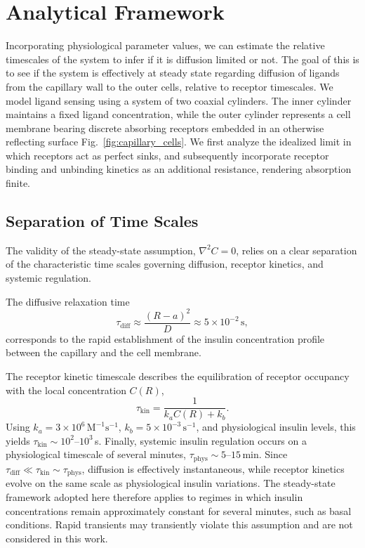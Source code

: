 \section{Analytical Framework}\label{sec:analytical}
Incorporating physiological parameter values,
we can estimate the relative timescales of the system to infer if it is diffusion limited or not.
The goal of this is to see if the system is effectively at steady state regarding diffusion of ligands from the capillary wall to the outer cells,
relative to receptor timescales.
We model ligand sensing using a system of two coaxial cylinders.
The inner cylinder maintains a fixed ligand concentration, while the outer cylinder represents a cell membrane bearing discrete absorbing receptors embedded in an otherwise reflecting surface Fig.~\ref{fig:capillary_cells}.
We first analyze the idealized limit in which receptors act as perfect sinks, and subsequently incorporate receptor binding and unbinding kinetics as an additional resistance, rendering absorption finite.

\subsection{Separation of Time Scales}\label{sec:timescales}
The validity of the steady-state assumption, $\nabla^{2} C = 0$,
relies on a clear separation of the characteristic time scales governing diffusion, receptor kinetics, and systemic regulation.

The diffusive relaxation time
\begin{equation}
    \tau_{\mathrm{diff}} \approx \frac{(R-a)^{2}}{D} \approx 5 \times 10^{-2}\,\mathrm{s},
    \label{eq:tau_diff}
\end{equation}
corresponds to the rapid establishment of the insulin concentration profile between the capillary and the cell membrane.

The receptor kinetic timescale describes the equilibration of receptor occupancy with the local concentration $C(R)$,
\begin{equation}
    \tau_{\mathrm{kin}} = \frac{1}{k_a C(R) + k_b}.
    \label{eq:tau_kin}
\end{equation}
Using $k_a = 3 \times 10^{6}\,\mathrm{M}^{-1}\mathrm{s}^{-1}$, $k_b = 5 \times 10^{-3}\,\mathrm{s}^{-1}$, and physiological insulin levels, this yields $\tau_{\mathrm{kin}} \sim 10^{2}$--$10^{3}$\,s.
Finally, systemic insulin regulation occurs on a physiological timescale of several minutes, $\tau_{\mathrm{phys}} \sim 5$--$15$\,min.
Since $\tau_{\mathrm{diff}} \ll \tau_{\mathrm{kin}} \sim \tau_{\mathrm{phys}}$, diffusion is effectively instantaneous, while receptor kinetics evolve on the same scale as physiological insulin variations. The steady-state framework adopted here therefore applies to regimes in which insulin concentrations remain approximately constant for several minutes, such as basal conditions. Rapid transients may transiently violate this assumption and are not considered in this work.

